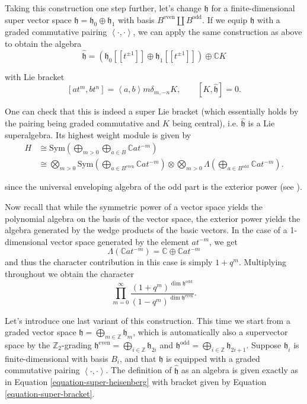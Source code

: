 \medskip\noindent
Taking this construction one step further,
let's change $\mathfrak{h}$ for a
finite-dimensional
super vector space
$\mathfrak{h}=\mathfrak{h}_0\oplus
\mathfrak{h}_1$
with basis $B^{\text{even}}\amalg
B^{\text{odd}}$.
If we equip $\mathfrak{h}$ with a graded
commutative
pairing $\left\langle{}\cdot,\cdot\right\rangle{}$, we can
apply the same construction as above
to obtain the algebra
\begin{equation}
\label{equation-super-heisenberg}
\hat{\mathfrak{h}}
=(\mathfrak{h}_0[[t^{\pm
1}]]\oplus\mathfrak{h}_1[[t^{\pm 1}]])
\oplus\mathbb{C}K
\end{equation}

\noindent
with Lie bracket
\begin{equation}
\label{equation-super-bracket}
[at^m,bt^n]=\left\langle{}a,b\right\rangle{}m\delta_{m,-n}K,\qquad
[K,\hat{\mathfrak{h}}]=0.
\end{equation}

\noindent
One can check that this is indeed a super
Lie bracket
(which essentially holds by the pairing
being graded commutative
and $K$ being central),
i.e. $\hat{\mathfrak{h}}$ is a Lie
superalgebra.
Its highest weight module is given by
$$
\begin{aligned}
H&\cong
\text{Sym}\left(\bigoplus_{m>0}\bigoplus_{a
\in B}
\mathbb{C}at^{-m}\right)\\
&\cong
\bigotimes_{m>0}\text{Sym}\left(\bigoplus_{a
\in B^{\text{even}}}
\mathbb{C}at^{-m}\right)
\otimes\bigotimes_{m>0}
\Lambda\left(\bigoplus_{a \in B^{\text{odd}}}
\mathbb{C}at^{-m}\right).
\end{aligned}
$$

\noindent
since the universal enveloping algebra of
the odd
part is the exterior power (see \cite[Video
8]{videos}).

Now recall that while the symmetric power of
a vector
space yields the polynomial algebra on the
basis of the vector space,
the exterior power yields the algebra
generated
by the wedge products of the basic vectors.
In the case of a 1-dimensional vector space
generated
by the element $at^{-m}$, we get
$$
\Lambda(\mathbb{C}at^{-m})=\mathbb{C} \oplus
\mathbb{C}at^{-m}
$$
and thus the character contribution in this
case is simply
$
1+q^m.
$
Multiplying throughout we obtain the
character
$$
\prod_{m=0}^\infty \frac{(1+q^m)^{\dim
\mathfrak{h}^{\text{odd}}}}{
(1-q^m)^{\dim \mathfrak{h}^{\text{even}}}}.
$$

\medskip\noindent
Let's introduce one last variant of this
construction.
This time we start from a graded vector space
$\mathfrak{h}=\bigoplus_{m \in
\mathbb{Z}}\mathfrak{h}_m$,
which is automatically also a supervector
space
by the $\mathbb{Z}_2$-grading
$\mathfrak{h}^{\text{even}}=\bigoplus_{i \in
\mathbb{Z}}\mathfrak{h}_{2i}$
and $\mathfrak{h}^{\text{odd}}=\bigoplus_{i
\in \mathbb{Z}}\mathfrak{h}_{2i+1}$.
Suppose $\mathfrak{h}_i$ is
finite-dimensional with basis $B_i$,
and that $\mathfrak{h}$ is equipped with a
graded commutative
pairing $\left\langle{}\cdot,\cdot\right\rangle{}$.
The definition of $\hat{\mathfrak{h}}$ as an
algebra
is given exactly as in Equation
\ref{equation-super-heisenberg}
with bracket given by Equation
\ref{equation-super-bracket}.

